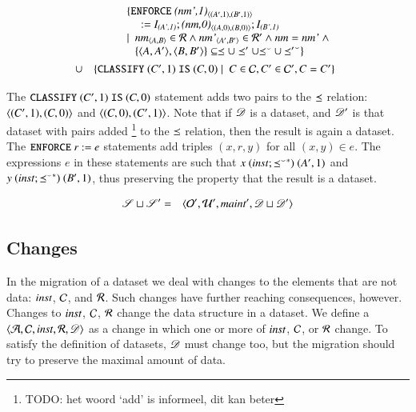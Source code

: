 \documentclass{elsarticle}
\begin{document}
\begin{definition}
   \begin{eqnarray}
      &&\begin{array}[t]{@{}l}
         \{ {\tt ENFORCE\ }\declare{(nm',1)}{(A',1)}{(B',1)}\\\quad{\tt\ :=\ }\ident{(A',1)};\declare{(nm,0)}{(A,0)}{(B,0)};\ident{(B',1)}\\
            \mid\ \begin{array}[t]{@{}l}
               \declare{nm}{A}{B}\in\rels\wedge\declare{nm'}{A'}{B'}\in\rels'\wedge\id{nm}=\id{nm'}\ \wedge\\
               \{\pair{A}{A'},\pair{B}{B'}\}\subseteq\isa\cup\isa'\cup\flip{\isa}\cup\flip{\isa'}\}
               \end{array}
           \end{array}\\
           &\cup&\begin{array}[t]{@{}l}
            \{ {\tt CLASSIFY\ }(C',1){\tt\ IS\ }(C,0)\mid\ C\in\concepts,C'\in\concepts',C=C'\}\\
           \end{array}
   \end{eqnarray}
\end{definition}

The ${\tt CLASSIFY\ }(C',1){\tt\ IS\ }(C,0)$ statement adds two pairs to the $\preceq$ relation:
$\langle{(C',1)},{(C,0)}\rangle$ and $\langle{(C,0)},{(C',1)}\rangle$.
Note that if $\mathscr{D}$ is a dataset, and $\mathscr{D}'$ is that dataset with pairs added%
\footnote{TODO: het woord `add' is informeel, dit kan beter} to the $\preceq$ relation, then the result is again a dataset.
The ${\tt ENFORCE\ }r{\tt\ :=\ }e$ statements add triples $(x,r,y)$ for all $(x,y)\in e$.
The expressions $e$ in these statements are such that $x\ (\text{\it inst\/} ; {{\preceq}^\smallsmile}^*)\ (A',1)$ and $y \ (\inst \compose \kleenestar{\flip{\isa}})\ (B',1)$, thus preserving the property that the result is a dataset.

\begin{definition}[]
   \begin{eqnarray}
      \mathscr{S}\sqcup\mathscr{S}'&=&\langle\mathcal{O}',\mathcal{U}',\text{\it maint\/}',\mathscr{D}\sqcup\mathscr{D}'\rangle
   \end{eqnarray}
\end{definition}

\subsection{Changes}
   In the migration of a dataset we deal with changes to the elements that are not data:
   $\text{\it inst\/}$, $\mathcal{C}$, and $\mathcal{R}$.
   Such changes have further reaching consequences, however.
   Changes to $\text{\it inst\/}$, $\mathcal{C}$, $\mathcal{R}$ change the data structure in a dataset.
   We define a  $\langle\mathcal{A},\mathcal{C},\text{\it inst\/},\mathcal{R},\mathscr{D}\rangle$ as a change in which one or more of $\text{\it inst\/}$, $\mathcal{C}$, or $\mathcal{R}$ change.
   To satisfy the definition of datasets, $\mathscr{D}$ must change too,
   but the migration should try to preserve the maximal amount of data.
\end{document}

